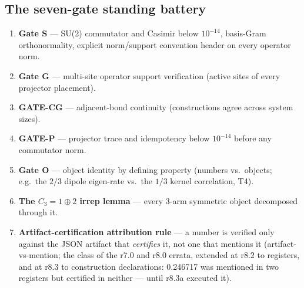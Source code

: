 \documentclass[11pt,a4paper]{article}
\theoremstyle{definition}
\begin{document}
\subsection*{The seven-gate standing battery}
\begin{enumerate}[leftmargin=1.6em]
\item \textbf{Gate S} --- SU(2) commutator and Casimir below
$10^{-14}$, basis-Gram orthonormality, explicit norm/support
convention header on every operator norm.
\item \textbf{Gate G} --- multi-site operator support verification
(active sites of every projector placement).
\item \textbf{GATE-CG} --- adjacent-bond continuity
(constructions agree across system sizes).
\item \textbf{GATE-P} --- projector trace and idempotency below
$10^{-14}$ before any commutator norm.
\item \textbf{Gate O} --- object identity by defining property
(numbers vs.\ objects; e.g.\ the $2/3$ dipole eigen-rate vs.\ the
$1/3$ kernel correlation, T4).
\item \textbf{The $C_3 = 1 \oplus 2$ irrep lemma} --- every
3-arm symmetric object decomposed through it.
\item \textbf{Artifact-certification attribution rule} --- a number
is verified only against the JSON artifact that \emph{certifies}
it, not one that mentions it (artifact-vs-mention; the class of
the r7.0 and r8.0 errata, extended at r8.2 to registers, and at
r8.3 to construction declarations: 0.246717 was mentioned in two
registers but certified in neither --- until r8.3a executed it).
\end{enumerate}
\end{document}
